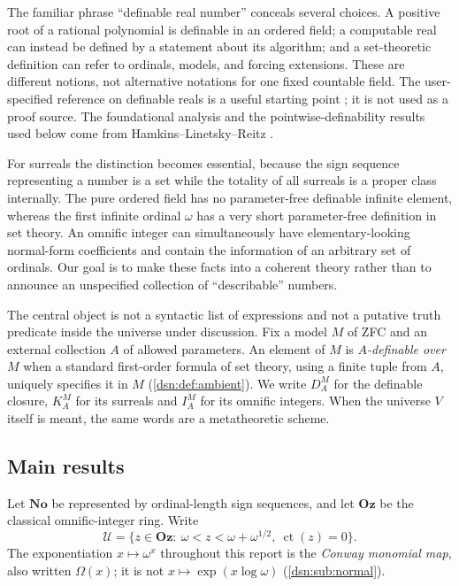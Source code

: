 \documentclass[11pt,a4paper]{article}
\numberwithin{equation}{section}
\theoremstyle{definition}
\theoremstyle{remark}
\newcommand{\No}{\mathbf{No}}
\newcommand{\Oz}{\mathbf{Oz}}
\newcommand{\ct}{\operatorname{ct}}
\newcommand{\Cell}{\mathcal U}
\begin{document}
The familiar phrase ``definable real number'' conceals several choices.
A positive root of a rational polynomial is definable in an ordered field;
a computable real can instead be defined by a statement about its
algorithm; and a set-theoretic definition can refer to ordinals, models,
and forcing extensions. These are different notions, not alternative
notations for one fixed countable field. The user-specified reference on
definable reals is a useful starting point \cite{WikiDef}; it is not used
as a proof source. The foundational analysis and the
pointwise-definability results used below come from
Hamkins--Linetsky--Reitz \cite{HLR}.

For surreals the distinction becomes essential, because the sign sequence
representing a number is a set while the totality of all surreals is a
proper class internally. The pure ordered field has no parameter-free
definable infinite element, whereas the first infinite ordinal $\omega$
has a very short parameter-free definition in set theory. An omnific
integer can simultaneously have elementary-looking normal-form
coefficients and contain the information of an arbitrary set of ordinals.
Our goal is to make these facts into a coherent theory rather than to
announce an unspecified collection of ``describable'' numbers.

The central object is not a syntactic list of expressions and not a
putative truth predicate inside the universe under discussion. Fix a model
$M$ of ZFC and an external collection $A$ of allowed parameters. An element
of $M$ is \emph{$A$-definable over $M$} when a standard first-order formula
of set theory, using a finite tuple from $A$, uniquely specifies it in $M$
(\cref{dsn:def:ambient}). We write $D^M_A$ for the definable closure,
$K^M_A$ for its surreals and $I^M_A$ for its omnific integers. When the
universe $V$ itself is meant, the same words are a metatheoretic scheme.

\subsection{Main results}\label{dsn:sub:main}

Let $\No$ be represented by ordinal-length sign sequences, and let $\Oz$
be the classical omnific-integer ring. Write
\begin{equation}\label{dsn:eq:maincell}
 \Cell=\{z\in\Oz:\ \omega<z<\omega+\omega^{1/2},\ \ct(z)=0\}.
\end{equation}
The exponentiation $x\mapsto\omega^x$ throughout this report is the
\emph{Conway monomial map}, also written $\Omega(x)$; it is not
$x\mapsto\exp(x\log\omega)$ (\cref{dsn:sub:normal}).
\end{document}
